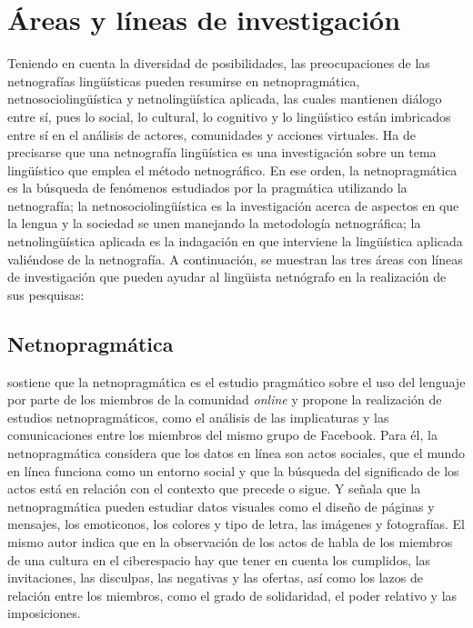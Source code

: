 \section{Áreas y líneas de investigación}\label{sec-areasylineasdeinvestigacion}

Teniendo en cuenta la diversidad de posibilidades, las preocupaciones de
las netnografías lingüísticas pueden resumirse en netnopragmática,
netnosociolingüística y netnolingüística aplicada, las cuales mantienen
diálogo entre sí, pues lo social, lo cultural, lo cognitivo y lo
lingüístico están imbricados entre sí en el análisis de actores,
comunidades y acciones virtuales. Ha de precisarse que una netnografía
lingüística es una investigación sobre un tema lingüístico que emplea el
método netnográfico. En ese orden, la netnopragmática es la búsqueda de
fenómenos estudiados por la pragmática utilizando la netnografía; la
netnosociolingüística es la investigación acerca de aspectos en que la
lengua y la sociedad se unen manejando la metodología netnográfica; la
netnolingüística aplicada es la indagación en que interviene la
lingüística aplicada valiéndose de la netnografía. A continuación, se
muestran las tres áreas con líneas de investigación que pueden ayudar al
lingüista netnógrafo en la realización de sus pesquisas:

\subsection{Netnopragmática}\label{sub-sec-netnopragmática}

\textcite{putrikusama2016} sostiene que la netnopragmática es el estudio pragmático
sobre el uso del lenguaje por parte de los miembros de la comunidad
\emph{online} y propone la realización de estudios netnopragmáticos,
como el análisis de las implicaturas y las comunicaciones entre los
miembros del mismo grupo de Facebook. Para él, la netnopragmática
considera que los datos en línea son actos sociales, que el mundo en
línea funciona como un entorno social y que la búsqueda del significado
de los actos está en relación con el contexto que precede o sigue. Y
señala que la netnopragmática pueden estudiar datos visuales como el
diseño de páginas y mensajes, los emoticonos, los colores y tipo de
letra, las imágenes y fotografías. El mismo autor indica que en la
observación de los actos de habla de los miembros de una cultura en el
ciberespacio hay que tener en cuenta los cumplidos, las invitaciones,
las disculpas, las negativas y las ofertas, así como los lazos de
relación entre los miembros, como el grado de solidaridad, el poder
relativo y las imposiciones.

